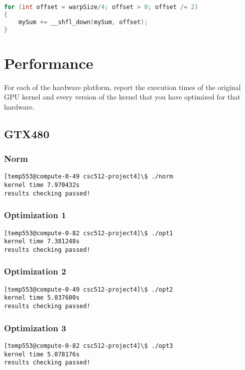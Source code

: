 \documentclass{article}
\begin{document}
  \begin{lstlisting}[language=C++,breaklines=true,caption='Opt 3: Shfl',basicstyle=\footnotesize]
for (int offset = warpSize/4; offset > 0; offset /= 2)
{
	mySum += __shfl_down(mySum, offset);
}
  \end{lstlisting}

\section{Performance}

  For each of the hardware platform, report the execution times of the
  original GPU kernel and every version of the kernel that you have
  optimized for that hardware.

  \subsection{GTX480}
  \subsubsection{Norm}
  \begin{lstlisting}[breaklines=true,basicstyle=\footnotesize]
[temp553@compute-0-49 csc512-project4]\$ ./norm 
kernel time 7.970432s
results checking passed!
  \end{lstlisting}

  \subsubsection{Optimization 1}
  \begin{lstlisting}[breaklines=true,basicstyle=\footnotesize]
[temp553@compute-0-82 csc512-project4]\$ ./opt1 
kernel time 7.381248s
results checking passed!
\end{lstlisting}

  \subsubsection{Optimization 2}
  \begin{lstlisting}[breaklines=true,basicstyle=\footnotesize]
[temp553@compute-0-49 csc512-project4]\$ ./opt2
kernel time 5.037600s
results checking passed!
\end{lstlisting}

  \subsubsection{Optimization 3}
  \begin{lstlisting}[breaklines=true,basicstyle=\footnotesize]
[temp553@compute-0-82 csc512-project4]\$ ./opt3
kernel time 5.078176s
results checking passed!
  \end{lstlisting}
\end{document}
